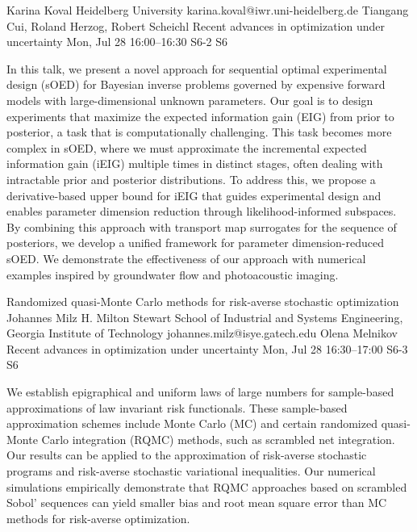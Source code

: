 \documentclass[12pt,lettersize,oneside]{book} %
\begin{document}
\begin{talk}
  {Karina Koval}%
  {Heidelberg University}%
  {karina.koval@iwr.uni-heidelberg.de}%
  {Tiangang Cui, Roland Herzog, Robert Scheichl}%
  {Recent advances in optimization under uncertainty}%
  {}%
  {Mon, Jul 28 16:00--16:30}%
  {S6-2}%
  {S6}%
    
   
In this talk, we present a novel approach for sequential optimal experimental design (sOED) for Bayesian inverse problems governed by expensive forward models with large-dimensional unknown parameters. Our goal is to design experiments that maximize the expected information gain (EIG) from prior to posterior, a task that is computationally challenging. This task becomes more complex in sOED, where we must approximate the incremental expected information gain (iEIG) multiple times in distinct stages, often dealing with intractable prior and posterior distributions. To address this, we propose a derivative-based upper bound for iEIG that guides experimental design and enables parameter dimension reduction through likelihood-informed subspaces. By combining this approach with transport map surrogates for the sequence of posteriors, we develop a unified framework for parameter dimension-reduced sOED. We demonstrate the effectiveness of our approach with numerical examples inspired by groundwater flow and photoacoustic imaging.
\end{talk}

\begin{talk}
  {Randomized quasi-Monte Carlo methods for risk-averse stochastic optimization}%
  {Johannes Milz}%
  {H. Milton Stewart School of Industrial and Systems Engineering, Georgia Institute of Technology}%
  {johannes.milz@isye.gatech.edu}%
  {Olena Melnikov}%
  {Recent advances in optimization under uncertainty}%
  {Mon, Jul 28 16:30--17:00}%
  {S6-3}%
  {S6}%
    

We establish epigraphical and uniform laws of large numbers for sample-based approximations of law invariant risk functionals. These sample-based approximation schemes include Monte Carlo (MC) and certain randomized quasi-Monte Carlo integration (RQMC) methods, such as scrambled net integration. Our results can be applied to the approximation of risk-averse stochastic programs and risk-averse stochastic variational inequalities. Our numerical simulations empirically demonstrate that RQMC approaches based on scrambled Sobol' sequences can yield smaller bias and root mean square error than MC methods for risk-averse optimization.




\end{talk}
\end{document}
